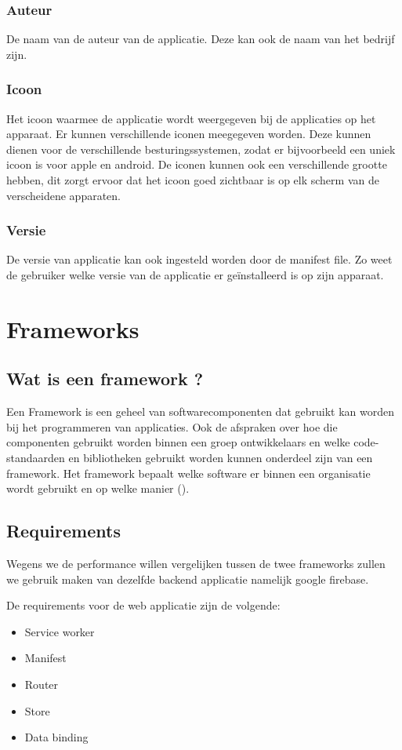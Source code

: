 \subsubsection{Auteur}
De naam van de auteur van de applicatie. Deze kan ook de naam van het bedrijf zijn.

\subsubsection{Icoon}
Het icoon waarmee de applicatie wordt weergegeven bij de applicaties op het apparaat. Er kunnen verschillende iconen meegegeven worden. Deze kunnen dienen voor de verschillende besturingssystemen, zodat er bijvoorbeeld een uniek icoon is voor apple en android. De iconen kunnen ook een verschillende grootte hebben, dit zorgt ervoor dat het icoon goed zichtbaar is op elk scherm van de verscheidene apparaten.

\subsubsection{Versie}
De versie van applicatie kan ook ingesteld worden door de manifest file. Zo weet de gebruiker welke versie van de applicatie er geïnstalleerd is op zijn apparaat.

\section{Frameworks}
\subsection{Wat is een framework ?}
Een Framework is een geheel van softwarecomponenten dat gebruikt kan worden bij het programmeren van applicaties. Ook de afspraken over hoe die componenten gebruikt worden binnen een groep ontwikkelaars en welke code-standaarden en bibliotheken gebruikt worden kunnen onderdeel zijn van een framework. Het framework bepaalt welke software er binnen een organisatie wordt gebruikt en op welke manier (\cite{WIKI_FRAMEWORK}).

\subsection{Requirements}
Wegens we de performance willen vergelijken tussen de twee frameworks zullen we gebruik maken van dezelfde backend applicatie namelijk google firebase.

De requirements voor de web applicatie zijn de volgende:
\begin{itemize}
	\item Service worker
	\item Manifest
	\item Router
	\item Store
	\item Data binding
\end{itemize}

